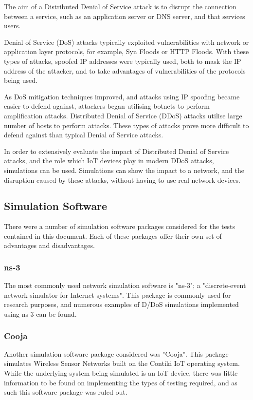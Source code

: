 The aim of a Distributed Denial of Service attack is to disrupt the connection
between a service, such as an application server or DNS server, and that
services users.

Denial of Service (DoS) attacks typically exploited vulnerabilities with network
or application layer protocols, for example, Syn Floods or HTTP Floods. With these
types of attacks, spoofed IP addresses were typically used, both to mask the IP
address of the attacker, and to take advantages of vulnerabilities of the
protocols being used.

As DoS mitigation techniques improved, and attacks using IP spoofing became
easier to defend against, attackers began utilising botnets to perform
amplification attacks. Distributed Denial of Service (DDoS) attacks utilise
large number of hosts to perform attacks. These types of attacks prove more
difficult to defend against than typical Denial of Service attacks.

In order to extensively evaluate the impact of Distributed Denial of Service
attacks, and the role which IoT devices play in modern DDoS attacks, simulations
can be used. Simulations can show the impact to a network, and the disruption
caused by these attacks, without having to use real network devices.

\subsection{Simulation Software}

There were a number of simulation software packages considered for the tests
contained in this document. Each of these packages offer their own set of
advantages and disadvantages.

\subsubsection{ns-3}

The most commonly used network simulation software is "ns-3"; a "discrete-event
network simulator for Internet systems"\cite{}. This package is commonly used for
research purposes, and numerous examples of D/DoS simulations implemented using
ns-3 can be found\cite{}\cite{}.

\subsubsection{Cooja}

Another simulation software package considered was "Cooja". This package
simulates Wireless Sensor Networks built on the Contiki IoT operating
system\cite{}. While the underlying system being simulated is an IoT device,
there was little information to be found on implementing the types of testing
required, and as such this software package was ruled out.

